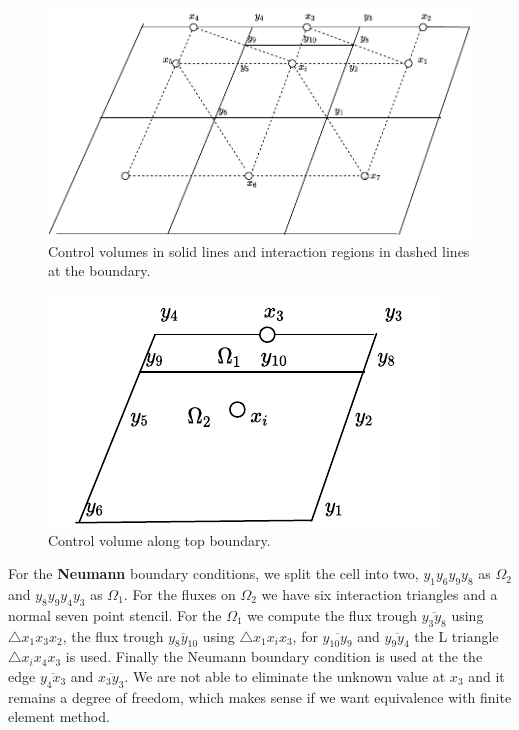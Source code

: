 \documentclass[../Main/main.tex]{subfiles}
\begin{document}
	\begin{figure}[H]
		\centering
		\includegraphics{modified_L_scheme.pdf}
		\caption{Control volumes in solid lines and interaction regions in dashed lines at the boundary.}
	\end{figure}
	\begin{figure}[H]
		\centering
		\includegraphics{volumepartition.pdf}
		\caption{Control volume along top boundary.}
		\label{fig:volumepartition}
	\end{figure}
	For the \textbf{Neumann} boundary conditions, we split the cell into two, $y_1 y_6 y_9 y_8$ as $\Omega_2$ and $y_8 y_9 y_4 y_3$ as  $\Omega_1$. For the fluxes on $\Omega_2$ we have six interaction triangles and a normal seven point stencil. For the $\Omega_1$ we compute the flux trough $\overline{y_3 y_8}$ using $\triangle x_1 x_3 x_2$, the flux trough $\overline{y_8 y_{10}}$ using $\triangle x_1 x_i x_3$, for $\overline{y_{10}y_9}$ and $\overline{y_9 y_4}$ the L triangle  $\triangle x_i x_4 x_3$ is used. Finally the Neumann boundary condition is used at the the edge $\overline{y_4 x_3}$ and $\overline{x_3 y_3}$. We are not able to eliminate the unknown value at $x_3$ and it remains a degree of freedom, which makes sense if we want equivalence with finite element method.
\end{document}

